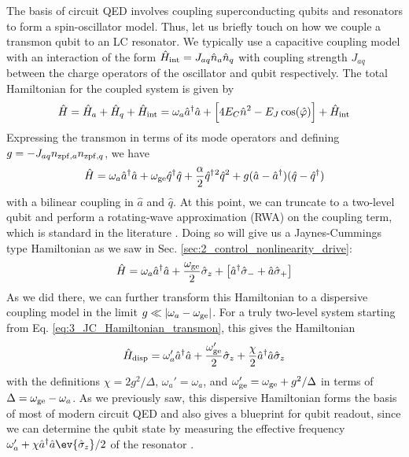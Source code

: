 The basis of circuit QED involves coupling superconducting qubits and resonators to form a spin-oscillator model. Thus, let us briefly touch on how we couple a transmon qubit to an LC resonator. We typically use a capacitive coupling model with an interaction of the form $\hat{H}_{\rm int} = J_{aq} \hat{n}_a \hat{n}_q$ with coupling strength $J_{aq}$ between the charge operators of the oscillator and qubit respectively. The total Hamiltonian for the coupled system is given by
\begin{equation}
    \hat{H} = \hat{H}_a + \hat{H}_q + \hat{H}_{\rm int} = \omega_a \hat{a}^\dagger\hat{a} + \Big[4E_C\hat{n}^2 - E_J\cos(\hat{\varphi})\Big] + \hat{H}_{\rm int}
    \label{eq:3_transmon_resonator_full}
\end{equation}
Expressing the transmon in terms of its mode operators and defining $g = -J_{aq}n_{{\rm zpf},a}n_{{\rm zpf},q}$, we have 
\begin{equation}
    \hat{H} = \omega_a \hat{a}^\dagger\hat{a} + \omega_{\rm ge}\hat{q}^\dagger \hat{q} + \frac{\alpha}{2}\hat{q}^\dagger{}^2\hat{q}^2 + g(\hat{a}-\hat{a}^\dagger)(\hat{q}-\hat{q}^\dagger)
    \label{eq:3_transmon_resonator_linear_coupling}
\end{equation}
with a bilinear coupling in $\hat{a}$ and $\hat{q}$. At this point, we can truncate to a two-level qubit and perform a rotating-wave approximation (RWA) on the coupling term, which is standard in the literature \cite{blais2021circuit}. Doing so will give us a Jaynes-Cummings type Hamiltonian as we saw in Sec. \ref{sec:2_control_nonlinearity_drive}:
\begin{equation}
    \hat{H} = \omega_a \hat{a}^\dagger\hat{a} + \frac{\omega_{\rm ge}}{2}\hat{\sigma}_z + \big[\hat{a}^\dagger\hat{\sigma}_- + \hat{a}\hat{\sigma}_+\big]
    \label{eq:3_JC_Hamiltonian_transmon}
\end{equation}
As we did there, we can further transform this Hamiltonian to a dispersive coupling model in the limit $g \ll |\omega_a - \omega_{\rm ge}|$. For a truly two-level system starting from Eq. \eqref{eq:3_JC_Hamiltonian_transmon}, this gives the Hamiltonian
\begin{equation}
    \hat{H}_{\rm disp} = \omega_a' \hat{a}^\dagger\hat{a} + \frac{\omega_{\rm ge}'}{2}\hat{\sigma}_z + \frac{\chi}{2}\hat{a}^\dagger\hat{a}\hat{\sigma}_z
    \label{eq:3_dispersive_model_transmon_TLS}
\end{equation}
with the definitions $\chi = 2g^2/\Delta$, $\omega_a' = \omega_a$, and $\omega_{\rm ge}' = \omega_{\rm ge} + g^2/\Delta$ in terms of $\Delta = \omega_{\rm ge} - \omega_a$. As we previously saw, this dispersive Hamiltonian forms the basis of most of modern circuit QED and also gives a blueprint for qubit readout, since we can determine the qubit state by measuring the effective frequency $\omega_a' + \chi \hat{a}^\dagger\hat{a}\ev{\sigmaz}/2$ of the resonator \cite{blais2004cavity}. 


